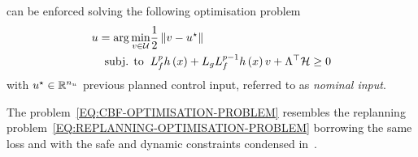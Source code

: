 can be enforced solving the following optimisation problem
\begin{equation}%
    \label{EQ:CBF-OPTIMISATION-PROBLEM}
    \begin{split}
        \uu = \arg \min_{v \in \uset} & \frac{1}{2} \norm{v - \uu\s} \\
        \text{subj. to} \hspace{0.2cm} & L_{\xfun}^{\order} \yfun \lp \xx \rp + L_{\ufun} L_{\xfun}^{\order-1} \yfun \lp \xx \rp v + \Lambda\T\HH \ge 0
    \end{split}
\end{equation}
with $u^{\star} \in \mathbb{R}^{n_{u}}$ previous planned control input, referred to as \emph{nominal input}.
\begin{remark}
    The problem~\eqref{EQ:CBF-OPTIMISATION-PROBLEM} resembles the replanning problem~\eqref{EQ:REPLANNING-OPTIMISATION-PROBLEM}
    borrowing the same loss and with the safe and dynamic constraints condensed in~.
\end{remark}

